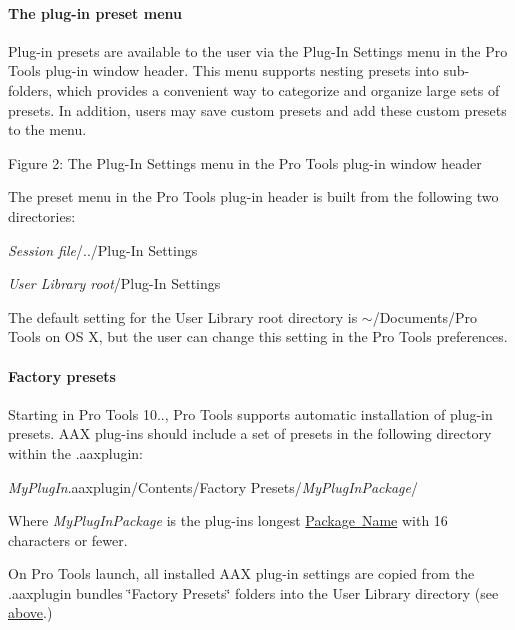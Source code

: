 \hypertarget{a00830_subsubsection__plugin_preset_menu_}{}\paragraph{The plug-\/in preset menu}\label{a00830_subsubsection__plugin_preset_menu_}
 Plug-\/in presets are available to the user via the Plug-\/\+In Settings menu in the Pro Tools plug-\/in window header. This menu supports nesting presets into sub-\/folders, which provides a convenient way to categorize and organize large sets of presets. In addition, users may save custom presets and add these custom presets to the menu.

  Figure 2\+: The Plug-\/\+In Settings menu in the Pro Tools plug-\/in window header

The preset menu in the Pro Tools plug-\/in header is built from the following two directories\+:


\begin{DoxyItemize}
\item {\itshape Session file}/../\+Plug-\/\+In Settings  
\item {\itshape User Library root}/\+Plug-\/\+In Settings  
\end{DoxyItemize}

The default setting for the User Library root directory is $\sim$/\+Documents/\+Pro Tools on OS X, but the user can change this setting in the Pro Tools preferences.

\hypertarget{a00830_subsubsection__plugin_presets_}{}\paragraph{Factory presets}\label{a00830_subsubsection__plugin_presets_}
 Starting in Pro Tools 10.., Pro Tools supports automatic installation of plug-\/in presets. A\+AX plug-\/ins should include a set of presets in the following directory within the .aaxplugin\+:


\begin{DoxyItemize}
\item {\itshape My\+Plug\+In}.aaxplugin/\+Contents/\+Factory Presets/{\itshape My\+Plug\+In\+Package}/  
\end{DoxyItemize}

Where {\itshape My\+Plug\+In\+Package} is the plug-\/in\textquotesingle{}s longest \mbox{\hyperlink{a01777_acf7410e0d06cf64bea36bf7d18b3456c}{Package Name}} with 16 characters or fewer.

On Pro Tools launch, all installed A\+AX plug-\/in settings are copied from the .aaxplugin bundles\textquotesingle{} \char`\"{}\+Factory Presets\char`\"{} folders into the User Library directory (see \mbox{\hyperlink{a00830_subsubsection__plugin_preset_menu_}{above}}.)

